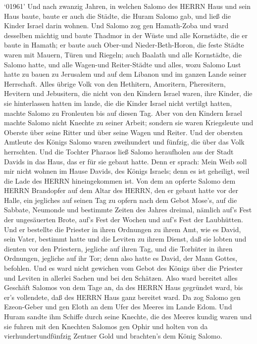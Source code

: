  `01961' Und nach zwanzig Jahren, in welchen Salomo des
HERRN Haus und sein Haus baute,  baute er auch die Städte,
die Huram Salomo gab, und ließ die Kinder Israel darin wohnen.
 Und Salomo zog gen Hamath-Zoba und ward desselben mächtig
 und baute Thadmor in der Wüste und alle Kornstädte, die er
baute in Hamath;  er baute auch Ober-und Nieder-Beth-Horon,
die feste Städte waren mit Mauern, Türen und Riegeln;  auch
Baalath und alle Kornstädte, die Salomo hatte, und alle Wagen-und
Reiter-Städte und alles, wozu Salomo Lust hatte zu bauen zu Jerusalem
und auf dem Libanon und im ganzen Lande seiner Herrschaft. 
Alles übrige Volk von den Hethitern, Amoritern, Pheresitern, Hevitern
und Jebusitern, die nicht von den Kindern Israel waren, 
ihre Kinder, die sie hinterlassen hatten im lande, die die Kinder Israel
nicht vertilgt hatten, machte Salomo zu Fronleuten bis auf diesen Tag.
 Aber von den Kindern Israel machte Salomo nicht Knechte zu
seiner Arbeit; sondern sie waren Kriegsleute und Oberste über seine
Ritter und über seine Wagen und Reiter.  Und der obersten
Amtleute des Königs Salomo waren zweihundert und fünfzig, die über das
Volk herrschten.  Und die Tochter Pharaos ließ Salomo
heraufholen aus der Stadt Davids in das Haus, das er für sie gebaut
hatte. Denn er sprach: Mein Weib soll mir nicht wohnen im Hause Davids,
des Königs Israels; denn es ist geheiligt, weil die Lade des HERRN
hineingekommen ist.  Von dem an opferte Salomo dem HERRN
Brandopfer auf dem Altar des HERRN, den er gebaut hatte vor der Halle,
 ein jegliches auf seinen Tag zu opfern nach dem Gebot
Mose's, auf die Sabbate, Neumonde und bestimmte Zeiten des Jahres
dreimal, nämlich auf's Fest der ungesäuerten Brote, auf's Fest der
Wochen und auf's Fest der Laubhütten.  Und er bestellte die
Priester in ihren Ordnungen zu ihrem Amt, wie es David, sein Vater,
bestimmt hatte und die Leviten zu ihrem Dienst, daß sie lobten und
dienten vor den Priestern, jegliche auf ihren Tag, und die Torhüter in
ihren Ordnungen, jegliche auf ihr Tor; denn also hatte es David, der
Mann Gottes, befohlen.  Und es ward nicht gewichen vom
Gebot des Königs über die Priester und Leviten in allerlei Sachen und
bei den Schätzen.  Also ward bereitet alles Geschäft
Salomos von dem Tage an, da des HERRN Haus gegründet ward, bis er's
vollendete, daß des HERRN Haus ganz bereitet ward.  Da zog
Salomo gen Ezeon-Geber und gen Eloth an dem Ufer des Meeres im Lande
Edom.  Und Huram sandte ihm Schiffe durch seine Knechte,
die des Meeres kundig waren und sie fuhren mit den Knechten Salomos gen
Ophir und holten von da vierhundertundfünfzig Zentner Gold und
brachten's dem König Salomo.

